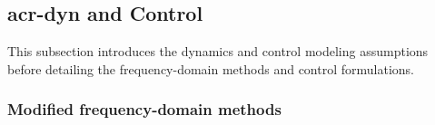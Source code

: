 



\subsection{\gls{acr-dyn} and Control}\label{sec:dynamics}
This subsection introduces the dynamics and control modeling assumptions before detailing the frequency-domain methods and control formulations.

\subsubsection{Modified frequency-domain methods}
\label{sec:mod-freq-domain}

